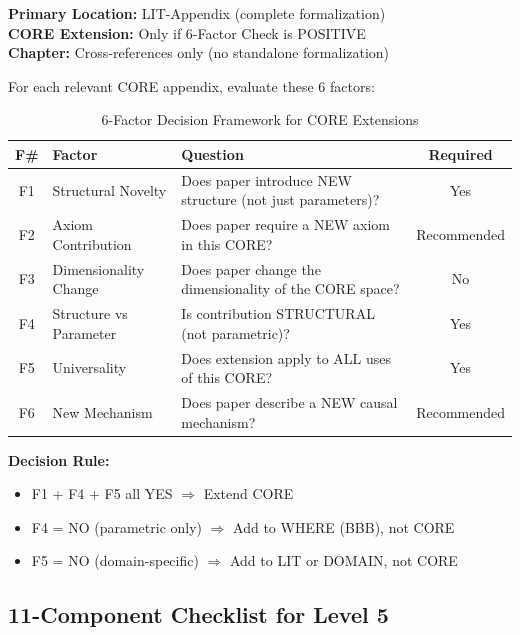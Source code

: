 \begin{tcolorbox}[colback=blue!5!white, colframe=blue!75!black,
    title=Architecture Principle: LIT $\to$ CORE $\to$ Chapter]
\textbf{Primary Location:} LIT-Appendix (complete formalization)\\
\textbf{CORE Extension:} Only if 6-Factor Check is POSITIVE\\
\textbf{Chapter:} Cross-references only (no standalone formalization)
\end{tcolorbox}

For each relevant CORE appendix, evaluate these 6 factors:

\begin{table}[htbp]
\centering
\caption{6-Factor Decision Framework for CORE Extensions}
\label{tab:6factor-framework}
\begin{tabular}{@{}clp{7cm}c@{}}
\toprule
\textbf{F\#} & \textbf{Factor} & \textbf{Question} & \textbf{Required} \\
\midrule
F1 & Structural Novelty & Does paper introduce NEW structure (not just parameters)? & Yes \\
F2 & Axiom Contribution & Does paper require a NEW axiom in this CORE? & Recommended \\
F3 & Dimensionality Change & Does paper change the dimensionality of the CORE space? & No \\
F4 & Structure vs Parameter & Is contribution STRUCTURAL (not parametric)? & Yes \\
F5 & Universality & Does extension apply to ALL uses of this CORE? & Yes \\
F6 & New Mechanism & Does paper describe a NEW causal mechanism? & Recommended \\
\bottomrule
\end{tabular}
\end{table}

\textbf{Decision Rule:}
\begin{itemize}
    \item F1 + F4 + F5 all YES $\Rightarrow$ Extend CORE
    \item F4 = NO (parametric only) $\Rightarrow$ Add to WHERE (BBB), not CORE
    \item F5 = NO (domain-specific) $\Rightarrow$ Add to LIT or DOMAIN, not CORE
\end{itemize}

\subsection{11-Component Checklist for Level 5}
\label{sec:paperint-11components}

